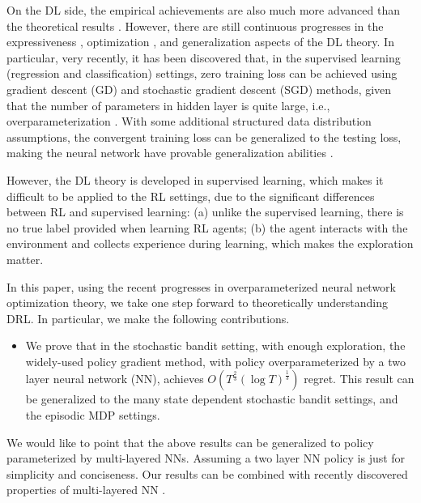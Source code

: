 On the DL side, the empirical achievements are also much more advanced than the  theoretical results \citep{goodfellow2016deep,zhang2016understanding}. However, there are still continuous progresses in the expressiveness \citep{cybenko1989approximation,raghu2017expressive}, optimization \citep{kawaguchi2016deep,li2017convergence,li2018learning,du2018gradientA,du2018gradientB,allen2018convergenceA,allen2018convergenceB}, and generalization \cite{neyshabur2017exploring,allen2018learning} aspects of the DL theory. In particular, very recently, it has been discovered that, in the supervised learning (regression and classification) settings, zero training loss can be achieved using gradient descent (GD) and stochastic gradient descent (SGD) methods, given that the number of parameters in hidden layer is quite large, i.e., overparameterization \citep{li2018learning,du2018gradientA,du2018gradientB,allen2018convergenceA,allen2018convergenceB}. With some additional structured data distribution assumptions, the convergent training loss can be generalized to the testing loss, making the neural network have provable generalization abilities \citep{li2018learning,allen2018learning}.

However, the DL theory is developed in supervised learning, which makes it difficult to be applied to the RL settings, due to the significant differences between RL and supervised learning: (a) unlike the supervised learning, there is no true label provided when learning RL agents; (b) the agent interacts with the environment and collects experience during learning, which makes the exploration matter.

In this paper, using the recent progresses in overparameterized neural network optimization theory, we take one step forward to theoretically understanding DRL. In particular, we make the following contributions.
\begin{itemize}
    \item We prove that in the stochastic bandit setting, with enough exploration, the widely-used policy gradient method, with policy overparameterized by a two layer neural network (NN), achieves $O\left( T^{\frac{2}{3} } \left(\log{T}\right)^{\frac{1}{3}}\right)$ regret. This result can be generalized to the many state dependent stochastic bandit settings, and the episodic MDP settings.
\end{itemize}

We would like to point that the above results can be generalized to policy parameterized by multi-layered NNs. Assuming a two layer NN policy is just for simplicity and conciseness. Our results can be combined with recently discovered properties of multi-layered NN   \citep{allen2018convergenceA,allen2018convergenceB,du2018gradientA}.

